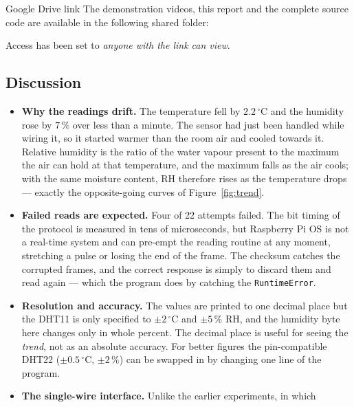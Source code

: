 \documentclass[10pt,a4paper]{article}
\begin{document}
\begin{titledbox}[before skip=6pt]{Google Drive link}
\noindent The demonstration videos, this report and the complete source code are
available in the following shared folder:

\vspace{4pt}
\noindent\drivefolder

\vspace{4pt}
{\small\color{cmnt} Access has been set to \emph{anyone with the link can view}.}
\end{titledbox}

\subsection*{Discussion}
\label{sec:discussion}
\begin{itemize}
  \item \textbf{Why the readings drift.} The temperature fell by
        $2.2\,^{\circ}\mathrm{C}$ and the humidity rose by $7\,\%$ over less than a
        minute. The sensor had just been handled while wiring it, so it started warmer
        than the room air and cooled towards it. Relative humidity is the ratio of the
        water vapour present to the maximum the air can hold at that temperature, and
        the maximum falls as the air cools; with the same moisture content, RH
        therefore rises as the temperature drops --- exactly the opposite-going curves
        of Figure~\ref{fig:trend}.
  \item \textbf{Failed reads are expected.} Four of 22 attempts failed. The bit
        timing of the protocol is measured in tens of microseconds, but Raspberry Pi OS
        is not a real-time system and can pre-empt the reading routine at any moment,
        stretching a pulse or losing the end of the frame. The checksum catches the
        corrupted frames, and the correct response is simply to discard them and read
        again --- which the program does by catching the \texttt{RuntimeError}.
  \item \textbf{Resolution and accuracy.} The values are printed to one decimal place
        but the DHT11 is only specified to $\pm2\,^{\circ}\mathrm{C}$ and $\pm5\,\%$
        RH, and the humidity byte here changes only in whole percent. The decimal
        place is useful for seeing the \emph{trend}, not as an absolute accuracy. For
        better figures the pin-compatible DHT22 ($\pm0.5\,^{\circ}\mathrm{C}$,
        $\pm2\,\%$) can be swapped in by changing one line of the program.
  \item \textbf{The single-wire interface.} Unlike the earlier experiments, in which

\end{itemize}
\end{document}
